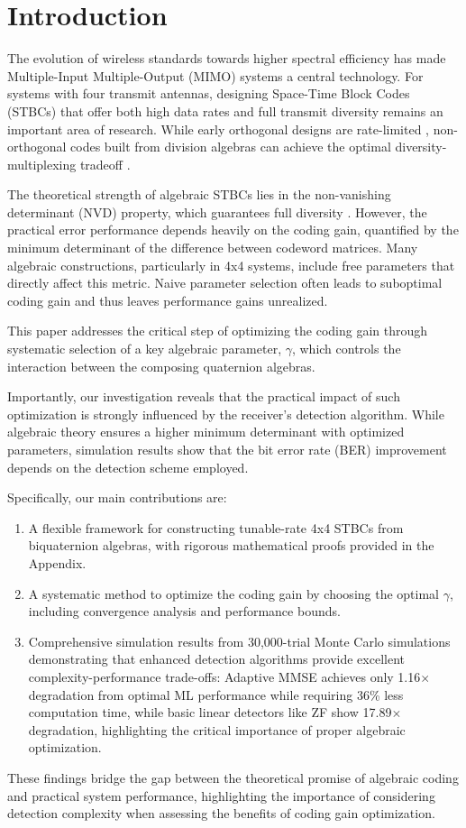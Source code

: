 \section{Introduction}
The evolution of wireless standards towards higher spectral efficiency has made Multiple-Input Multiple-Output (MIMO) systems a central technology. 
For systems with four transmit antennas, designing Space-Time Block Codes (STBCs) that offer both high data rates and full transmit diversity remains an important area of research. 
While early orthogonal designs are rate-limited \cite{1}, non-orthogonal codes built from division algebras can achieve the optimal diversity-multiplexing tradeoff \cite{2,3}.

The theoretical strength of algebraic STBCs lies in the non-vanishing determinant (NVD) property, which guarantees full diversity \cite{4}. However, the practical error performance depends heavily on the coding gain, quantified by the minimum determinant of the difference between codeword matrices. 
Many algebraic constructions, particularly in 4x4 systems, include free parameters that directly affect this metric. 
Naive parameter selection often leads to suboptimal coding gain and thus leaves performance gains unrealized.

This paper addresses the critical step of optimizing the coding gain through systematic selection of a key algebraic parameter, \(\gamma\), which controls the interaction between the composing quaternion algebras.

Importantly, our investigation reveals that the practical impact of such optimization is strongly influenced by the receiver's detection algorithm. 
While algebraic theory ensures a higher minimum determinant with optimized parameters, simulation results show that the bit error rate (BER) improvement depends on the detection scheme employed.

Specifically, our main contributions are:
\begin{enumerate}
    \item A flexible framework for constructing tunable-rate 4x4 STBCs from biquaternion algebras, with rigorous mathematical proofs provided in the Appendix.
    \item A systematic method to optimize the coding gain by choosing the optimal \(\gamma\), including convergence analysis and performance bounds.
    \item Comprehensive simulation results from 30,000-trial Monte Carlo simulations demonstrating that enhanced detection algorithms provide excellent complexity-performance trade-offs: Adaptive MMSE achieves only 1.16$\times$ degradation from optimal ML performance while requiring 36\% less computation time, while basic linear detectors like ZF show 17.89$\times$ degradation, highlighting the critical importance of proper algebraic optimization.
\end{enumerate}

These findings bridge the gap between the theoretical promise of algebraic coding and practical system performance, highlighting the importance of considering detection complexity when assessing the benefits of coding gain optimization.
